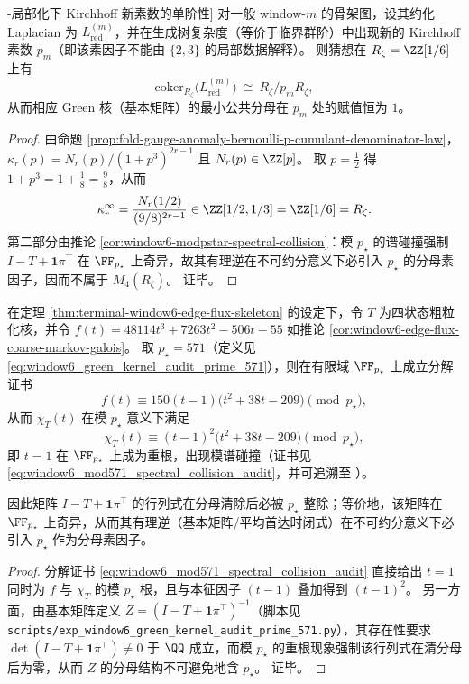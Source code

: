 \begin{conjecture}[\(\ZZ[1/6]\)-局部化下 Kirchhoff 新素数的单阶性]\label{conj:window-kirchhoff-prime-single-order-localization}
对一般 window-\(m\) 的骨架图，设其约化 Laplacian 为 \(L_{\mathrm{red}}^{(m)}\)，并在生成树复杂度（等价于临界群阶）中出现新的 Kirchhoff 素数 \(p_m\)（即该素因子不能由 \(\{2,3\}\) 的局部数据解释）。
则猜想在 \(R_\zeta=\ZZ[1/6]\) 上有
\[
\mathrm{coker}_{R_\zeta}\!\bigl(L_{\mathrm{red}}^{(m)}\bigr)\ \cong\ R_\zeta/p_mR_\zeta,
\]
从而相应 Green 核（基本矩阵）的最小公共分母在 \(p_m\) 处的赋值恒为 \(1\)。
\end{conjecture}

\begin{proof}
由命题 \ref{prop:fold-gauge-anomaly-bernoulli-p-cumulant-denominator-law}，
\(
\kappa_r(p)=N_r(p)/(1+p^3)^{2r-1}
\)
且 \(N_r(p)\in\ZZ[p]\)。
取 \(p=\tfrac12\) 得 \(1+p^3=1+\tfrac18=\tfrac98\)，从而
\[
\kappa_r^\infty=\frac{N_r(1/2)}{(9/8)^{2r-1}}\in \ZZ[1/2,1/3]=\ZZ[1/6]=R_\zeta.
\]
第二部分由推论 \ref{cor:window6-modpstar-spectral-collision}：模 \(p_\star\) 的谱碰撞强制 \(I-T+\mathbf 1\pi^\top\) 在 \(\FF_{p_\star}\) 上奇异，故其有理逆在不可约分意义下必引入 \(p_\star\) 的分母素因子，因而不属于 \(M_4(R_\zeta)\)。
证毕。
\end{proof}

\begin{corollary}\label{cor:window6-modpstar-spectral-collision}
在定理 \ref{thm:terminal-window6-edge-flux-skeleton} 的设定下，令 \(T\) 为四状态粗粒化核，并令
\(
f(t)=48114t^3+7263t^2-506t-55
\)
如推论 \ref{cor:window6-edge-flux-coarse-markov-galois}。
取 \(p_\star=571\)（定义见 \eqref{eq:window6_green_kernel_audit_prime_571}），则在有限域 \(\FF_{p_\star}\) 上成立分解证书
\[
f(t)\equiv 150(t-1)\bigl(t^2+38t-209\bigr)\pmod{p_\star},
\]
从而 \(\chi_T(t)\) 在模 \(p_\star\) 意义下满足
\[
\chi_T(t)\equiv (t-1)^2\bigl(t^2+38t-209\bigr)\pmod{p_\star},
\]
即 \(t=1\) 在 \(\FF_{p_\star}\) 上成为重根，出现模谱碰撞（证书见 \eqref{eq:window6_mod571_spectral_collision_audit}，并可追溯至 \cite{Internal2026Window6Mod571SpectralCollisionAudit20260227}）。
\par
因此矩阵 \(I-T+\mathbf 1\pi^\top\) 的行列式在分母清除后必被 \(p_\star\) 整除；等价地，该矩阵在 \(\FF_{p_\star}\) 上奇异，从而其有理逆（基本矩阵/平均首达时闭式）在不可约分意义下必引入 \(p_\star\) 作为分母素因子。
\end{corollary}
\begin{proof}
分解证书 \eqref{eq:window6_mod571_spectral_collision_audit} 直接给出 \(t=1\) 同时为 \(f\) 与 \(\chi_T\) 的模 \(p_\star\) 根，且与本征因子 \((t-1)\) 叠加得到 \((t-1)^2\)。
另一方面，由基本矩阵定义 \(Z=(I-T+\mathbf 1\pi^\top)^{-1}\)（脚本见 \texttt{scripts/exp\_window6\_green\_kernel\_audit\_prime\_571.py}），其存在性要求 \(\det(I-T+\mathbf 1\pi^\top)\neq 0\) 于 \(\QQ\) 成立，而模 \(p_\star\) 的重根现象强制该行列式在清分母后为零，从而 \(Z\) 的分母结构不可避免地含 \(p_\star\)。
证毕。
\end{proof}



